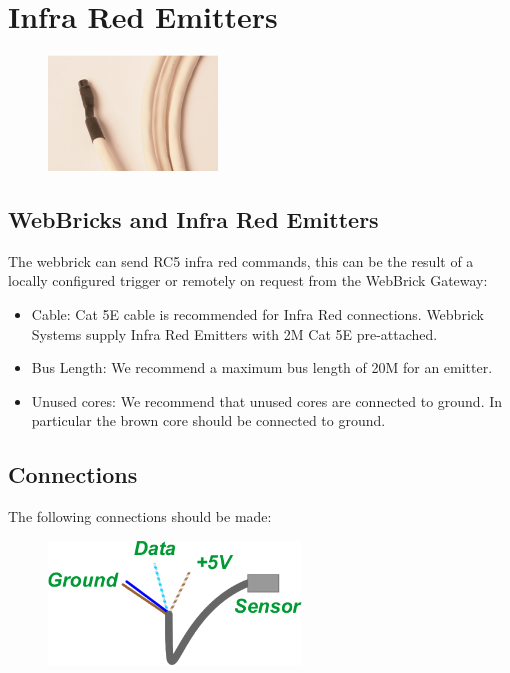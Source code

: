 \section{Infra Red Emitters}

\begin{figure}[H]
\centering
\includegraphics[width=0.4\textwidth]{Images/InfraRedEmitterPic.png}
\end{figure}

\subsection{WebBricks and Infra Red Emitters}

The webbrick can send RC5 infra red commands, this can be the result of a locally configured trigger or remotely 
on request from the WebBrick Gateway:

	\begin{itemize}
	  
	  \item{Cable:} Cat 5E cable is recommended for Infra Red connections. Webbrick Systems supply
	  		Infra Red Emitters with 2M Cat 5E pre-attached.
	  		
	  \item{Bus Length:}  We recommend a maximum bus length of 20M for an emitter.
	  			
	  \item{Unused cores:} We recommend that unused cores are connected to ground.  In particular the brown core
	  			should be connected to ground.
	  			
	\end{itemize}


\subsection{Connections}

The following connections should be made:

\begin{figure}[H]
\centering
\includegraphics[width=0.6\textwidth]{Images/InfraRedEmitterWiring.png}
\end{figure}

